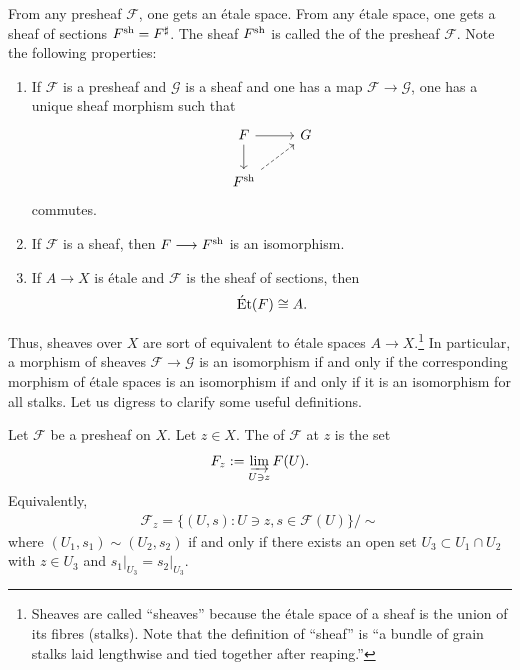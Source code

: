 \documentclass [11 pt, oneside] {article}
\begin{document}
From any presheaf $\mathscr{F}$, one gets an \'etale space. From any \'etale space, one gets a sheaf of sections $\mathscr{F}\sh = \mathscr{F}^\sharp$. The sheaf $\mathscr{F}\sh$ is called the  of the presheaf $\mathscr{F}$. Note the following properties:
\begin{enumerate}
	\item If $\mathscr{F}$ is a presheaf and $\mathscr{G}$ is a sheaf and one has a map $\mathscr{F}\longrightarrow \mathscr{G}$, one has a unique sheaf morphism such that
		\[
		\begin{tikzcd}
			\mathscr{F} \ar[r] \ar[d] & \mathscr{G}\\
			\mathscr{F}\sh \ar[ur, dashed]
		\end{tikzcd}
		\]
		commutes.
	\item If $\mathscr{F}$ is a sheaf, then $\mathscr{F}\longrightarrow \mathscr{F}\sh$ is an isomorphism. 
	\item If $A\longrightarrow X$ is \'etale and $\mathscr{F}$ is the sheaf of sections, then
		\begin{align*}
			\Et ( \mathscr{F} ) \isomto A.
		\end{align*}
\end{enumerate}

Thus, sheaves over $X$ are sort of equivalent to \'etale spaces $A\longrightarrow X$.\footnote{Sheaves are called ``sheaves'' because the \'etale space of a sheaf is the union of its fibres (stalks). Note that the definition of ``sheaf'' is ``a bundle of grain stalks laid lengthwise and tied together after reaping.''} In particular, a morphism of sheaves $\mathscr{F}\longrightarrow \mathscr{G}$ is an isomorphism if and only if the corresponding morphism of \'etale spaces is an isomorphism if and only if it is an isomorphism for all stalks. Let us digress to clarify some useful definitions.

 \begin{definition}[ ]\label{}\text{}
Let $\mathscr{F}$ be a presheaf on $X$. Let $z\in X$. The  of $\mathscr{F}$ at $z$ is the set
\begin{align*}
	\mathscr{F}_z := \varinjlim_{U\ni z} \mathscr{F}(U).
\end{align*}
Equivalently,
\begin{align*}
	\mathscr{F}_z= \{(U,s) : U\ni z, s\in  \mathscr{F}(U)\} / \sim
\end{align*}
where $(U_1,s_1)\sim(U_2,s_2) $ if and only if there exists an open set $U_3 \subset U_1\cap U_2$ with $z\in U_3$ and $s_1\big |_{U_3} = s_2\big |_{U_3}$.
\end{definition}
\end{document}
